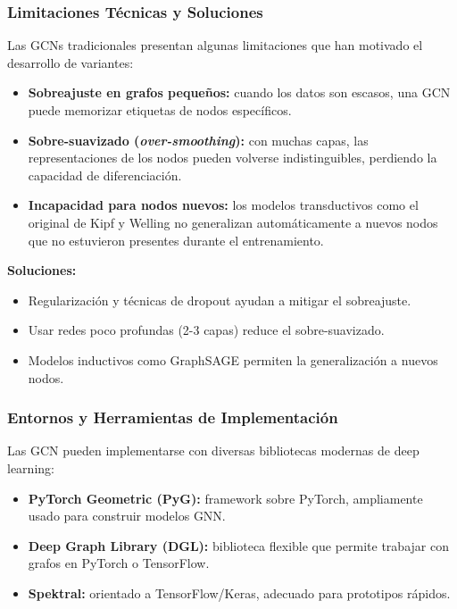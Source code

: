\documentclass[11pt]{article} %
\begin{document}
\vspace{10pt}

\subsubsection{Limitaciones Técnicas y Soluciones}

Las GCNs tradicionales presentan algunas limitaciones que han motivado el desarrollo de variantes:

\begin{itemize}
    \item \textbf{Sobreajuste en grafos pequeños:} cuando los datos son escasos, una GCN puede memorizar etiquetas de nodos específicos.
    \item \textbf{Sobre-suavizado (\textit{over-smoothing}):} con muchas capas, las representaciones de los nodos pueden volverse indistinguibles, perdiendo la capacidad de diferenciación.
    \item \textbf{Incapacidad para nodos nuevos:} los modelos transductivos como el original de Kipf y Welling no generalizan automáticamente a nuevos nodos que no estuvieron presentes durante el entrenamiento.
\end{itemize}

\textbf{Soluciones:}
\begin{itemize}
    \item Regularización y técnicas de dropout ayudan a mitigar el sobreajuste.
    \item Usar redes poco profundas (2-3 capas) reduce el sobre-suavizado.
    \item Modelos inductivos como GraphSAGE permiten la generalización a nuevos nodos.
\end{itemize}

\subsubsection{Entornos y Herramientas de Implementación}

Las GCN pueden implementarse con diversas bibliotecas modernas de deep learning:

\begin{itemize}
    \item \textbf{PyTorch Geometric (PyG):} framework sobre PyTorch, ampliamente usado para construir modelos GNN.
    \item \textbf{Deep Graph Library (DGL):} biblioteca flexible que permite trabajar con grafos en PyTorch o TensorFlow.
    \item \textbf{Spektral:} orientado a TensorFlow/Keras, adecuado para prototipos rápidos.
\end{itemize}
\end{document}
